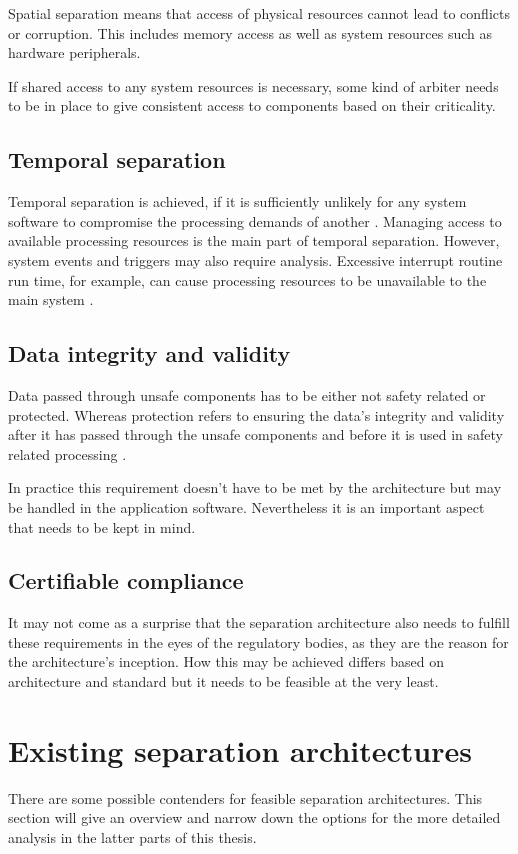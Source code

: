 Spatial separation means that access of physical resources cannot lead to conflicts or corruption. This includes memory access as well as system resources such as hardware peripherals. \cite{Wittenstein.spatial.2017}\cite{perez2013safety}

If shared access to any system resources is necessary, some kind of arbiter needs to be in place to give consistent access to components based on their criticality. 
\subsection{Temporal separation}
Temporal separation is achieved, if it is sufficiently unlikely for any system software to compromise the processing demands of another \cite{Wittenstein.temporal.2017}. 
Managing access to available processing resources is the main part of temporal separation. However, system events and triggers may also require analysis. Excessive interrupt routine run time, for example, can cause processing resources to be unavailable to the main system \cite{Wittenstein.temporal.2017}. 
\subsection{Data integrity and validity}
Data passed through unsafe components has to be either not safety related or protected. Whereas protection refers to ensuring the data's integrity and validity after it has passed through the unsafe components and before it is used in safety related processing \cite{Wittenstein.spatial.2017}.

In practice this requirement doesn't have to be met by the architecture but may be handled in the application software. Nevertheless it is an important aspect that needs to be kept in mind.
\subsection{Certifiable compliance}
It may not come as a surprise that the separation architecture also needs to fulfill these requirements in the eyes of the regulatory bodies, as they are the reason for the architecture's inception.
How this may be achieved differs based on architecture and standard but it needs to be feasible at the very least. 


\section{Existing separation architectures}
There are some possible contenders for feasible separation architectures. This section will give an overview and narrow down the options for the more detailed analysis in the latter parts of this thesis.
